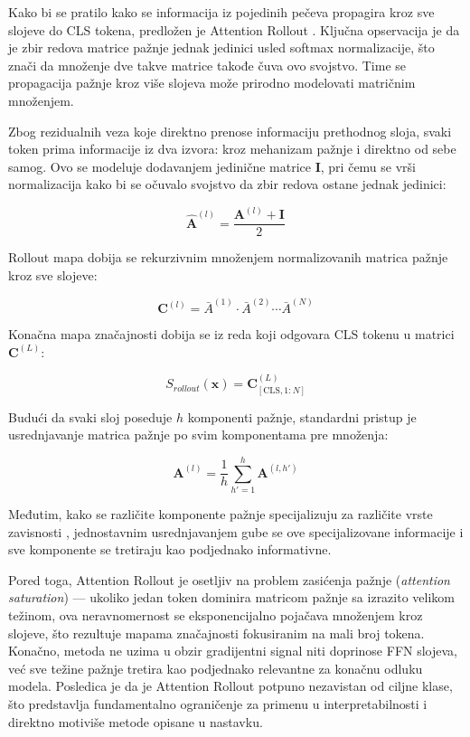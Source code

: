 Kako bi se pratilo kako se informacija iz pojedinih pečeva propagira 
kroz sve slojeve do CLS tokena, predložen je Attention Rollout 
\cite{abnar2020quantifying}. Ključna opservacija je da je zbir redova matrice 
pažnje jednak jedinici usled softmax normalizacije, što znači da množenje dve 
takve matrice takođe čuva ovo svojstvo. Time se propagacija pažnje kroz više 
slojeva može prirodno modelovati matričnim množenjem.

Zbog rezidualnih veza koje direktno prenose informaciju prethodnog sloja, 
svaki token prima informacije iz dva izvora: kroz mehanizam pažnje i direktno 
od sebe samog. Ovo se modeluje dodavanjem jedinične matrice $\mathbf{I}$, 
pri čemu se vrši normalizacija kako bi se očuvalo svojstvo da zbir redova 
ostane jednak jedinici:

\begin{equation}
    \hat{\mathbf{A}}^{(l)} = \frac{\mathbf{A}^{(l)} + \mathbf{I}}{2}
\end{equation}

Rollout mapa dobija se rekurzivnim množenjem normalizovanih matrica pažnje 
kroz sve slojeve:

\begin{equation}
    \mathbf{C}^{(l)} = \bar{A}^{(1)} \cdot \bar{A}^{(2)} \cdots \bar{A}^{(N)}
\end{equation}

Konačna mapa značajnosti dobija se iz reda koji odgovara CLS tokenu u 
matrici $\mathbf{C}^{(L)}$:

\begin{equation}
    S_{rollout}(\mathbf{x}) = \mathbf{C}^{(L)}_{[\text{CLS}, 1:N]}
\end{equation}

Budući da svaki sloj poseduje $h$ komponenti pažnje, standardni pristup je 
usrednjavanje matrica pažnje po svim komponentama pre množenja:

\begin{equation}
    \mathbf{A}^{(l)} = \frac{1}{h} \sum_{h'=1}^{h} \mathbf{A}^{(l,h')}
\end{equation}

Međutim, kako se različite komponente pažnje specijalizuju za različite vrste 
zavisnosti \cite{voita2019analyzing}, jednostavnim usrednjavanjem gube se 
ove specijalizovane informacije i sve komponente se tretiraju kao podjednako informativne.

Pored toga, Attention Rollout je osetljiv na problem zasićenja 
pažnje (\textit{attention saturation}) — ukoliko jedan token dominira 
matricom pažnje sa izrazito velikom težinom, ova neravnomernost se 
eksponencijalno pojačava množenjem kroz slojeve, što rezultuje mapama 
značajnosti fokusiranim na mali broj tokena. Konačno, metoda ne uzima u 
obzir gradijentni signal niti doprinose FFN slojeva, već sve težine pažnje 
tretira kao podjednako relevantne za konačnu odluku modela. Posledica je 
da je Attention Rollout potpuno nezavistan od ciljne klase, što predstavlja fundamentalno 
ograničenje za primenu u interpretabilnosti i direktno motiviše metode opisane u nastavku.

